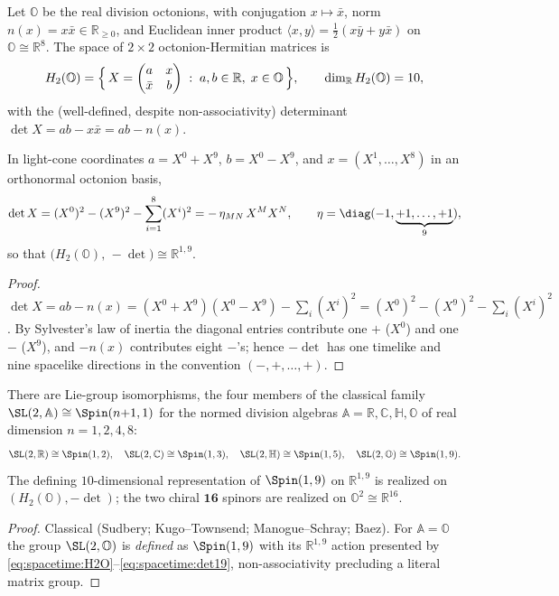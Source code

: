 Let $\mathbb O$ be the real division octonions, with conjugation $x\mapsto\bar x$,
norm $n(x)=x\bar x\in\mathbb R_{\ge0}$, and Euclidean inner product
$\langle x,y\rangle=\tfrac12(x\bar y+y\bar x)$ on $\mathbb O\cong\mathbb R^8$. The
space of $2\times2$ octonion-Hermitian matrices is
\begin{equation}\label{eq:spacetime:H2O}
  H_2(\mathbb O)=\Bigl\{\,X=\begin{pmatrix} a & x\\ \bar x & b\end{pmatrix}
  \;:\; a,b\in\mathbb R,\; x\in\mathbb O \,\Bigr\},\qquad
  \dim_{\mathbb R}H_2(\mathbb O)=10,
\end{equation}
with the (well-defined, despite non-associativity) determinant
$\det X = ab - x\bar x = ab - n(x)$.

\begin{theorem}
\label{thm:spacetime:minkowski}
In light-cone coordinates $a=X^0+X^9$, $b=X^0-X^9$, and $x=(X^1,\dots,X^8)$ in an
orthonormal octonion basis,
\begin{equation}\label{eq:spacetime:det19}
  \det X = (X^0)^2-(X^9)^2-\sum_{i=1}^{8}(X^i)^2 = -\,\eta_{MN}\,X^M X^N,\qquad
  \eta=\diag(-1,\underbrace{+1,\dots,+1}_{9}),
\end{equation}
so that $\bigl(H_2(\mathbb O),\,-\det\bigr)\cong\mathbb R^{1,9}$.
\end{theorem}
\begin{proof}
$\det X = ab-n(x)=(X^0+X^9)(X^0-X^9)-\sum_i(X^i)^2=(X^0)^2-(X^9)^2-\sum_i(X^i)^2$.
By Sylvester's law of inertia the diagonal entries contribute one $+$ ($X^0$) and one
$-$ ($X^9$), and $-n(x)$ contributes eight $-$'s; hence $-\det$ has one timelike and
nine spacelike directions in the convention $(-,+,\dots,+)$.
\end{proof}

\begin{theorem}
\label{thm:spacetime:exc}
There are Lie-group isomorphisms, the four members of the classical family
$\SL(2,\mathbb A)\cong\Spin(n{+}1,1)$ for the normed division algebras
$\mathbb A=\mathbb R,\mathbb C,\mathbb H,\mathbb O$ of real dimension $n=1,2,4,8$:
\begin{equation}\label{eq:spacetime:sl2}
  \SL(2,\mathbb R)\cong\Spin(1,2),\quad
  \SL(2,\mathbb C)\cong\Spin(1,3),\quad
  \SL(2,\mathbb H)\cong\Spin(1,5),\quad
  \SL(2,\mathbb O)\cong\Spin(1,9).
\end{equation}
The defining $10$-dimensional representation of $\Spin(1,9)$ on $\mathbb R^{1,9}$ is
realized on $(H_2(\mathbb O),-\det)$; the two chiral $\mathbf{16}$ spinors are
realized on $\mathbb O^2\cong\mathbb R^{16}$.
\end{theorem}
\begin{proof}
Classical (Sudbery; Kugo--Townsend; Manogue--Schray; Baez). For $\mathbb A=\mathbb O$
the group $\SL(2,\mathbb O)$ is \emph{defined} as $\Spin(1,9)$ with its
$\mathbb R^{1,9}$ action presented by \eqref{eq:spacetime:H2O}--\eqref{eq:spacetime:det19},
non-associativity precluding a literal matrix group.
\end{proof}

